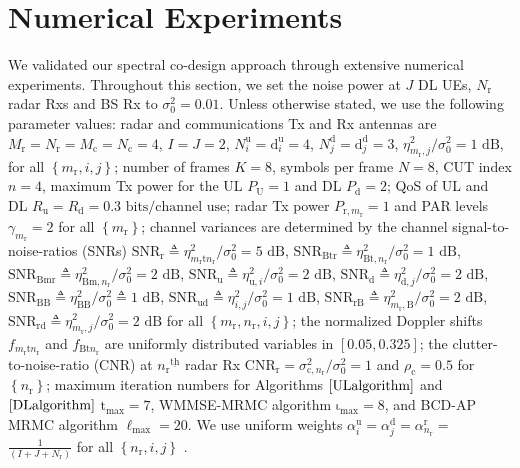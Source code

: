 \documentclass[10pt,journal]{IEEEtran}
\newcommand{\paren}[1]{\left({#1}\right)}
\newcommand{\bracket}[1]{{\left [{#1}\right ]}}
\newcommand{\braces}[1]{{\left\{ {#1}\right\}}}
\newcommand{\ith}[1]    {{#1}^{\underline{\text{th}}}}
\newcommand{\rr}{_\mathrm{r}}
\newcommand{\cc}{_\mathrm{c}}
\newcommand{\sfrac}[2]{#1/#2}
\theoremstyle{definition}
\begin{document}
\section{Numerical Experiments}
\label{sec:numerical}
We validated our spectral co-design approach through extensive numerical experiments. %
Throughout this section, we set the noise power at $\mathit{J}$ DL UEs, $\mathit{N}\rr$ radar Rxs and BS Rx to $\sigma^2_0=0.01$. Unless otherwise stated, we use the following parameter values: radar and communications Tx and Rx antennas are $\mathit{M}\rr=\mathit{N}\rr=\mathit{M}\cc=\mathit{N}\cc=4$, $\mathit{I}=\mathit{J}=2$, $\mathit{N}^{\textrm{u}}_i=\mathrm{d}^{\textrm{u}}_i=4$, $\mathit{N}^{\textrm{d}}_j=\mathrm{d}^{\textrm{d}}_j=3$,  $\sfrac{\eta^2_{m\rr,j}}{\sigma^2_0}=1\textrm{ dB}$, for all $\braces{m\rr,i,j}$; number of frames $\mathit{K}=8$, symbols per frame $\mathit{N}=8$, CUT index $n=4$, maximum Tx power for the UL $\mathit{P}_\textrm{U}=1$ and DL $\mathit{P}_\textrm{d}=2$; QoS of UL and DL $\mathit{R}_{\textrm{u}}=\mathit{R}_{\textrm{d}}=0.3\textrm{ bits/channel use}$; radar Tx power $\mathit{P}_{\textrm{r},m\rr}=1$ and PAR levels $\gamma_{m\rr}=2$ for all $\braces{m\rr}$; channel variances are determined by the channel signal-to-noise-ratios (SNRs) $\mathrm{SNR}_{\textrm{r}}\triangleq\sfrac{\eta^2_{m\rr\textrm{t}n\rr}}{\sigma^2_{0}}=5\textrm{ dB}$, $\mathrm{SNR}_{\textrm{Btr}}\triangleq\sfrac{\eta^2_{\textrm{Bt},n\rr}}{\sigma^2_{0}}=1 \textrm{ dB}$, $\mathrm{SNR}_{\textrm{Bmr}}\triangleq\sfrac{\eta^2_{\textrm{Bm},n\rr}}{\sigma^2_{0}}=2 \textrm{ dB}$, $\mathrm{SNR}_{\textrm{u}}\triangleq\sfrac{\eta^2_{\textrm{u},i}}{\sigma^2_{0}}=2\textrm{ dB}$, $\mathrm{SNR}_{\textrm{d}}\triangleq\sfrac{\eta^2_{\textrm{d},j}}{\sigma^2_0}=2\textrm{ dB}$, $\mathrm{SNR}_{\textrm{BB}}\triangleq\sfrac{\eta^2_{\textrm{BB}}}{\sigma^2_{0}}\triangleq1\textrm{ dB}$, $\mathrm{SNR}_{\textrm{ud}}\triangleq\sfrac{\eta^2_{i,j}}{\sigma^2_{0}}=1\textrm{ dB}$, $\mathrm{SNR}_{\textrm{rB}}\triangleq\sfrac{\eta^2_{m\rr,\textrm{B}}}{\sigma^2_0}=2\textrm{ dB}$, $\mathrm{SNR}_{\textrm{rd}}\triangleq\sfrac{\eta^2_{m\rr,j}}{\sigma^2_0}=2\textrm{ dB}$ for all $\braces{m\rr,n\rr,i,j}$; the normalized Doppler shifts $f_{m\rr\textrm{t}n\rr}$ and $f_{\textrm{Bt}n\rr}$ are uniformly distributed variables in $\bracket{0.05,0.325}$; the clutter-to-noise-ratio (CNR) at $\ith{n\rr}$ radar Rx $\mathrm{CNR}_{\textrm{r}}=\sfrac{\sigma^2_{\text{c},n\rr}}{\sigma^2_0}=1$ and $\rho_{\textrm{c}}=0.5$ for $\braces{n\rr}$; maximum iteration numbers for Algorithms $\ref{ULalgorithm}$ and $\ref{DLalgorithm}$ $\mathrm{t}_{\textrm{max}}=7$, WMMSE-MRMC algorithm $\mathrm{\iota}_{\textrm{max}}=8$, and BCD-AP MRMC algorithm $\mathrm{\ell}_{\textrm{max}}=20$. We use uniform weights  $\alpha^\textrm{u}_{i}= \alpha^{\textrm{d}}_{j}=\alpha^\textrm{r}_{n\rr}=$ $\frac{1}{\paren{\mathit{I}+\mathit{J}+\mathit{N}\rr}}$ for all $\braces{n\rr,i,j}$ .
\end{document}
